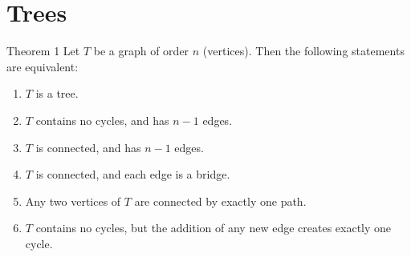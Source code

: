 \section{Trees}

\begin{thmbox}{Theorem 1}
Let $T$ be a graph of order $n$ (vertices). Then the following statements are equivalent:
\begin{enumerate}
  \item $T$ is a tree.
  \item $T$ contains no cycles, and has $n-1$ edges.
  \item $T$ is connected, and has $n-1$ edges.
  \item $T$ is connected, and each edge is a bridge.
  \item Any two vertices of $T$ are connected by exactly one path.
  \item $T$ contains no cycles, but the addition of any new edge creates exactly one cycle.
\end{enumerate}
\end{thmbox}

